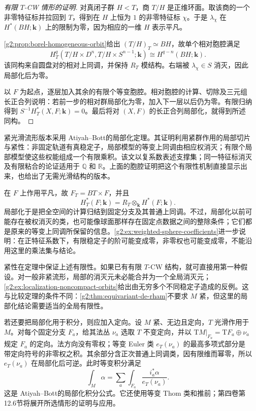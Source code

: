 \begin{proof}[有限 \(T\)-CW 情形的证明]
	对真闭子群 \(H<T\)，商 \(T/H\) 是正维环面。取该商的一个非零特征标并拉回到 \(T\)，得到在 \(H\) 上恒为 \(1\) 的非零特征标 \(\chi\)。于是 \(\lambda_\chi\) 在 \(H^*(BH;\mathbf k)\) 上的限制为零，因为相应的一维 \(H\) 表示平凡。

	\cref{g2:prop:borel-homogeneous-orbit}给出 \((T/H)_T\simeq BH\)，故单个相对胞腔满足
	\[
		H_T^q(T/H\times D^n,T/H\times S^{n-1};\mathbf k)
		\cong H^{q-n}(BH;\mathbf k).
	\]
	该同构来自圆盘对的相对上同调，并保持 \(R_T\) 模结构。右端被 \(\lambda_\chi\in S\) 消灭，因此局部化后为零。

	以 \(F\) 为起点，逐层加入其余的有限个等变胞腔。相对胞腔的计算、切除及三元组长正合列说明：若前一步的相对群局部化为零，加入下一层以后仍为零。有限归纳得到 \(S^{-1}H_T^*(X,F;\mathbf k)=0\)。最后将对 \((X,F)\) 的长正合列局部化，就得到所述同构。
\end{proof}

紧光滑流形版本采用 Atiyah--Bott\cite[\S3, Theorem 3.5]{AtiyahBott1984MomentMap}的局部化定理。其证明利用紧群作用的局部切片与紧性：非固定轨道有真稳定子，局部模型的等变上同调由相应权消灭；有限个局部模型使这些权能组成一个有限乘积。该文以复系数表述支撑集；同一特征标消灭及有限粘合的论证适用于 \(\mathbb Q\) 和 \(\mathbb R\)。上面的胞腔证明把这个有限性机制直接显示出来，也给出了无需光滑结构的版本。

\ProseParagraphBreak
在 \(F\) 上作用平凡，故 \(F_T=BT\times F\)，并且
\[
	H_T^*(F;\mathbf k)=R_T\otimes_{\mathbf k}H^*(F;\mathbf k).
\]
局部化于是把全空间的计算归结到固定分支及其普通上同调。不过，局部化以前可能存在被权消灭的类，也可能像球面那样存在固定点数据之间的整除条件；它们都是原来的等变上同调所保留的信息。\cref{g2:ex:weighted-sphere-coefficients}进一步说明：在正特征系数下，有限稳定子的阶可能变成零，非零权也可能变成零，不能沿用这里的乘法集与结论。

\ProseParagraphBreak
紧性在定理中保证上述有限性。如果已有有限 \(T\)-CW 结构，就可直接用第一种假设。对一般非紧流形，局部的消灭元未必能合并为一个全局消灭元；\cref{g2:ex:localization-noncompact-orbits}给出由无穷多个不同稳定子造成的反例。这与比较定理的条件不同：\cref{g2:thm:equivariant-de-rham}不要求 \(M\) 紧，但这里的局部化结论需要适当的全局有限性。

\ProseParagraphBreak
若还要把局部化用于积分，则应加入定向。设 \(M\) 紧、无边且定向，\(T\) 光滑作用于 \(M\)。对每个固定分支 \(F_a\)，给其法丛 \(\nu_a\) 选取 \(T\) 不变定向，并以 \(\mathrm TM|_{F_a}=\mathrm TF_a\oplus\nu_a\) 规定 \(F_a\) 的定向。法方向没有零权；等变 Euler 类 \(e_T(\nu_a)\) 的最高多项式部分是带定向符号的非零权之积。其余部分含正次普通上同调类，因有限维而幂零，所以 \(e_T(\nu_a)\) 在局部化后可逆。此时等变积分满足
\begin{equation}\label{g2:eq:equivariant-localized-integral}
	\int_M\alpha=\sum_a\int_{F_a}\frac{i_a^*\alpha}{e_T(\nu_a)}.
\end{equation}
这是 Atiyah--Bott\cite[\S3, formula (3.8)]{AtiyahBott1984MomentMap}的局部化积分公式。它还使用等变 Thom 类和推前；第四卷第12.6节将展开所选情形的证明与应用。

